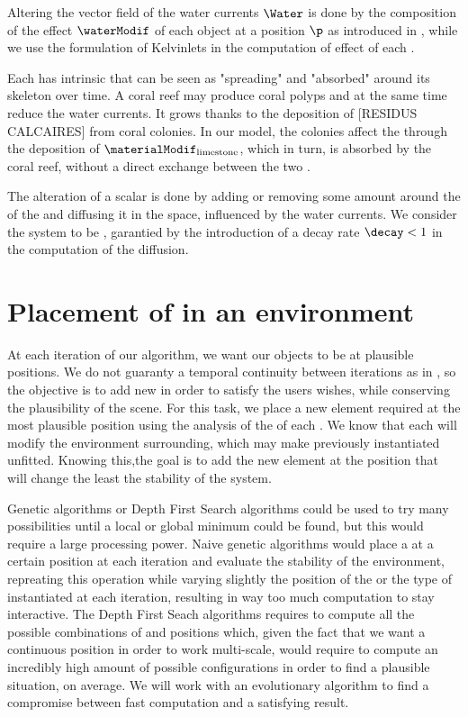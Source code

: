 Altering the vector field of the water currents $\Water$ is done by the composition of the effect $\waterModif$ of each object at a position $\p$ as introduced in \citep{Wejchert1991}, while we use the formulation of Kelvinlets \cite{DeGoes2017} in the computation of effect of each .

Each  has intrinsic  that can be seen as "spreading" and "absorbed" around its skeleton over time. A coral reef may produce coral polyps and at the same time reduce the water currents. It grows thanks to the deposition of [RESIDUS CALCAIRES] from coral colonies. In our model, the colonies affect the  through the deposition of  $\materialModif_\text{limestone}$, which in turn, is absorbed by the coral reef, without a direct exchange between the two .

The alteration of a scalar  is done by adding or removing some amount around the  of the  and diffusing it in the space, influenced by the water currents. We consider the system to be , garantied by the introduction of a decay rate $\decay < 1$ in the computation of the diffusion.



\section{Placement of  in an environment}
\label{sec:semantic-representation_generation-rules}
At each iteration of our algorithm, we want our objects to be at plausible positions. We do not guaranty a temporal continuity between iterations as in \citep{Ecormier-Nocca2021}, so the objective is to add new  in order to satisfy the users wishes, while conserving the plausibility of the scene. For this task, we place a new element required at the most plausible position using the analysis of the  of each . We know that each  will modify the environment surrounding, which may make previously instantiated  unfitted. Knowing this,the goal is to add the new element at the position that will change the least the stability of the system. 

Genetic algorithms or Depth First Search algorithms could be used to try many possibilities until a local or global minimum could be found, but this would require a large processing power. Naive genetic algorithms would place a  at a certain position at each iteration and evaluate the stability of the environment, repreating this operation while varying slightly the position of the  or the type of  instantiated at each iteration, resulting in way too much computation to stay interactive. The Depth First Seach algorithms requires to compute all the possible combinations of  and positions which, given the fact that we want a continuous position in order to work multi-scale, would require to compute an incredibly high amount of possible configurations in order to find a plausible situation, on average. We will work with an evolutionary algorithm to find a compromise between fast computation and a satisfying result.

